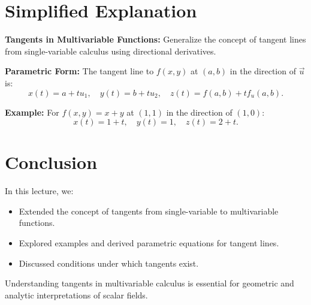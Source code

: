 \documentclass{article}
\begin{document}
\section*{Simplified Explanation}

\textbf{Tangents in Multivariable Functions:}
Generalize the concept of tangent lines from single-variable calculus using directional derivatives.

\textbf{Parametric Form:}
The tangent line to $f(x, y)$ at $(a, b)$ in the direction of $\vec{u}$ is:
\[
  x(t) = a + t u_1, \quad y(t) = b + t u_2, \quad z(t) = f(a, b) + t f_u(a, b).
\]

\textbf{Example:}
For $f(x, y) = x + y$ at $(1, 1)$ in the direction of $(1, 0)$:
\[
  x(t) = 1 + t, \quad y(t) = 1, \quad z(t) = 2 + t.
\]

\section*{Conclusion}

In this lecture, we:
\begin{itemize}
  \item Extended the concept of tangents from single-variable to multivariable functions.
  \item Explored examples and derived parametric equations for tangent lines.
  \item Discussed conditions under which tangents exist.
\end{itemize}

Understanding tangents in multivariable calculus is essential for geometric and analytic interpretations of scalar fields.
\end{document}
